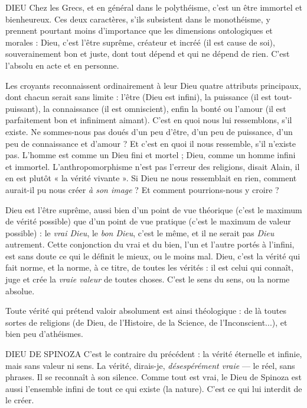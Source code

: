 DIEU Chez les Grecs, et en général dans le polythéisme, c’est un être immortel
et bienheureux. Ces deux caractères, s'ils subsistent dans le
monothéisme, y prennent pourtant moins d'importance que les dimensions
ontologiques et morales : Dieu, c’est l’être suprême, créateur et incréé (il est
cause de soi), souverainement bon et juste, dont tout dépend et qui ne dépend
de rien. C’est l’absolu en acte et en personne.

Les croyants reconnaissent ordinairement à leur Dieu quatre attributs principaux,
dont chacun serait sans limite : l’être (Dieu est infini), la puissance (il
est tout-puissant), la connaissance (il est omniscient), enfin la bonté ou l’amour
(il est parfaitement bon et infiniment aimant). C’est en quoi nous lui ressemblons,
s’il existe. Ne sommes-nous pas doués d’un peu d’être, d’un peu de puissance,
d’un peu de connaissance et d’amour ? Et c’est en quoi il nous ressemble,
s’il n'existe pas. L'homme est comme un Dieu fini et mortel ; Dieu, comme un
homme infini et immortel. L’anthropomorphisme n’est pas l'erreur des religions,
disait Alain, il en est plutôt « la vérité vivante ». Si Dieu ne nous ressemblait
en rien, comment aurait-il pu nous créer {\it à son image} ? Et comment pourrions-nous
y croire ?

Dieu est l’être suprême, aussi bien d’un point de vue théorique (c’est le
maximum de vérité possible) que d’un point de vue pratique (c’est le maximum
de valeur possible) : le {\it vrai Dieu}, le {\it bon Dieu}, c’est le même, et il ne serait pas
{\it Dieu} autrement. Cette conjonction du vrai et du bien, l’un et l’autre portés à
l'infini, est sans doute ce qui le définit le mieux, ou le moins mal. Dieu, c’est la
vérité qui fait norme, et la norme, à ce titre, de toutes les vérités : il est celui qui
connaît, juge et crée la {\it vraie valeur} de toutes choses. C’est le sens du sens, ou la
norme absolue.

Toute vérité qui prétend valoir absolument est ainsi théologique : de là
toutes sortes de religions (de Dieu, de l'Histoire, de la Science, de l’Inconscient...),
et bien peu d’athéismes.

DIEU DE SPINOZA C'est le contraire du précédent : la vérité éternelle et
infinie, mais sans valeur ni sens. La vérité, dirais-je,
{\it désespérément vraie} — le réel, sans phrases. Il se reconnaît à son silence.
Comme tout est vrai, le Dieu de Spinoza est aussi l’ensemble infini de tout
ce qui existe (la nature). C’est ce qui lui interdit de le créer.

